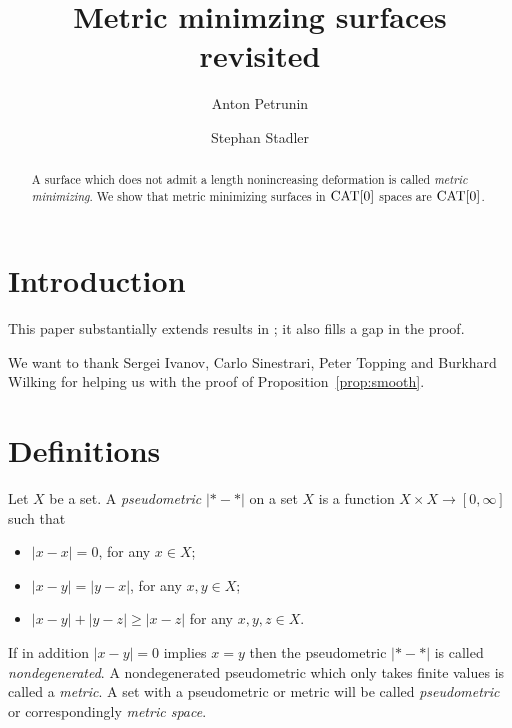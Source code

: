 \documentclass[a4paper,10pt]{amsart}
\begin{document}
\title{Metric minimzing surfaces revisited}
\author{Anton Petrunin}
\address{A. Petrunin\newline\vskip-4mm
Math. Dept. PSU,
University Park, PA 16802,
USA}
\author{Stephan Stadler}
\address{S. Stadler\newline\vskip-4mm
Math. Inst.,
Universit\"at M\"unchen, Theresienstr. 39, D-80333 M\"unchen, Germany}


\date{}

\begin{abstract}
A surface which does not admit a length nonincreasing deformation is called \emph{metric minimizing}.
We show that metric minimizing surfaces in $\mathop{\rm CAT}\nolimits[0]$ spaces are $\mathop{\rm CAT}\nolimits[0]$.
\end{abstract}
\maketitle

\section{Introduction}



This paper substantially extends results in \cite{petrunin-metric-min}; it also fills a gap in the proof. 

\medskip

We want to thank 
Sergei Ivanov,
Carlo Sinestrari,
Peter Topping
and
Burkhard Wilking
for helping us with the proof of Proposition~\ref{prop:smooth}.

\section{Definitions}\label{sec:Def}

Let $X$ be a set.
A \emph{pseudometric} $|{*}-{*}|$ on a set $X$ 
is a function $X\times X\to[0,\infty]$
such that 
\begin{itemize}
\item $|x-x|=0$, for any $x\in X$;
\item $|x-y|=|y-x|$, for any $x,y\in X$;
\item $|x-y|+|y-z|\ge|x-z|$ for any  $x,y,z\in X$.
\end{itemize}
If in addition $|x-y|=0$ implies $x=y$ then the pseudometric $|{*}-{*}|$ is called \emph{nondegenerated}.
A nondegenerated pseudometric which only takes finite values is called a \emph{metric}. A set with a pseudometric 
or metric will be called \emph{pseudometric} or correspondingly \emph{metric space}.
\end{document}
